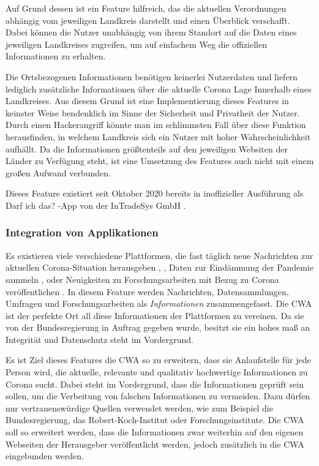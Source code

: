 \documentclass[conference,compsoc]{IEEEtran}
\begin{document}
Auf Grund dessen ist ein Feature hilfreich, das die aktuellen Verordnungen abhängig vom jeweiligen Landkreis darstellt und einen Überblick verschafft.
Dabei können die Nutzer unabhängig von ihrem Standort auf die Daten eines jeweiligen Landkreises zugreifen,
um auf einfachem Weg die offiziellen Informationen zu erhalten. 

Die Ortsbezogenen Informationen benötigen keinerlei Nutzerdaten und liefern lediglich zusätzliche Informationen über die aktuelle Corona Lage Innerhalb eines Landkreises.
Aus diesem Grund ist eine Implementierung dieses Features in keinster Weise bendenklich im Sinne der Sicherheit und Privatheit der Nutzer.
Durch einen Hackerangriff könnte man im schlimmsten Fall über diese Funktion herausfinden, in welchem Landkreis sich ein Nutzer mit hoher Wahrscheinlichkeit aufhällt.
Da die Informationen größtenteils auf den jeweiligen Websiten der Länder zu Verfügung steht, ist eine Umsetzung des Features auch nicht mit einem großen Aufwand verbunden.  

Dieses Feature existiert seit Oktober 2020 bereits in inoffizieller Ausführung als \glqq Darf ich das?\grqq{} -App von der InTradeSys GmbH \cite{DarfIchDas}.\\

\subsubsection{Integration von Applikationen}
Es existieren viele verschiedene Plattformen, die fast täglich neue Nachrichten zur aktuellen Corona-Situation herausgeben \cite{RKI}, \cite{BMG}, Daten zur Eindämmung der Pandemie sammeln \cite{RKIDatenspende}, \cite{Gedaechtnistest} oder Neuigkeiten zu Forschungsarbeiten mit Bezug zu Corona veröffentlichen \cite{GesundheitsforschungNews}.
In diesem Feature werden Nachrichten, Datensammlungen, Umfragen und Forschungsarbeiten als \textit{Informationen} zusammengefasst.
Die CWA ist der perfekte Ort all diese Informationen der Plattformen zu vereinen. 
Da sie von der Bundesregierung in Auftrag gegeben wurde, besitzt sie ein hohes maß an Integrität und Datenschutz steht im Vordergrund.

Es ist Ziel dieses Features die CWA so zu erweitern, dass sie Anlaufstelle für jede Person wird, die aktuelle, relevante und qualitativ hochwertige Informationen zu Corona sucht.
Dabei steht im Vordergrund, dass die Informationen geprüft sein sollen, um die Verbeitung von falschen Informationen zu vermeiden. 
Dazu dürfen nur vertrauenswürdige Quellen verwendet werden, wie zum Beispiel die Bundesregierung, das Robert-Koch-Institut oder Forschungsinstitute. 
Die CWA soll so erweitert werden, dass die Informationen zwar weiterhin auf den eigenen Webseiten der Herausgeber veröffentlicht werden, jedoch zusätzlich in die CWA eingebunden werden.
\end{document}
